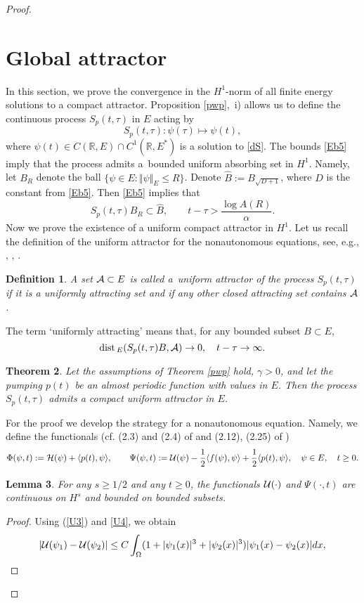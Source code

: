 \documentclass[11pt]{article}
\newtheorem{theorem}{Theorem}[section]
\newtheorem{definition}[theorem]{Definition}
\newtheorem{lemma}[theorem]{Lemma}
\newcommand{\fr}{\frac}
\newcommand{\R}{{\mathbb R}}
\newcommand{\cA}{{\cal A}}
\newcommand{\cH}{{\cal H}}
\newcommand{\cU}{{\cal U}}
\newcommand{\ga}{\gamma}
\newcommand{\Om}{\Omega}
\newcommand{\dist}{{\rm dist\5}}
\newcommand{\5}{{\hspace{0.5mm}}}
\numberwithin{equation}{section}
\newcommand{\ci}{\cite}
\newcommand{\la}{\label}
\newcommand{\be}{\begin{equation}}
\newcommand{\ee}{\end{equation}}
\newcommand{\bd}{\begin{definition}}
\newcommand{\ed}{\end{definition}}
\newcommand{\bt}{\begin{theorem}}
\newcommand{\et}{\end{theorem}}
\newcommand{\bl}{\begin{lemma}}
\newcommand{\el}{\end{lemma}}
\numberwithin{equation}{section}
\begin{document}
\begin{proof}
\section{Global attractor}\la{s4}
In this section, we prove the convergence
in the $H^1$-norm
of all finite energy solutions to a compact attractor.
Proposition \ref{pwp},~i) allows us to define the continuous process $S_p(t,\tau)$ in $E$ acting by
\be\la{Wtt}
S_p(t,\tau):\psi(\tau)\mapsto \psi(t),
\ee
where $\psi(t)\in C(\R,E)\cap C^1(\R, E^*)$ is a solution to \eqref{dS}.
The bounds \eqref{Eb5} imply that the process admits a~bounded uniform absorbing set in $H^1$.
Namely, let $B_R$ denote the ball $\{\psi\in E:\Vert\psi\Vert_E\le R\}$.
Denote $\hat B:=B_{\sqrt{D+1}}$, where $D$ is the constant from \eqref{Eb5}.
Then \eqref{Eb5} implies that
$$
S_p(t,\tau)B_R\subset \hat B,\qquad t-\tau> \fr{\log A(R)}\alpha.
$$
Now we prove the existence of a uniform compact attractor in $H^1$.
Let us recall the definition of the uniform attractor for the nonautonomous
equations, see, e.g., \ci{Har1991}, \cite[Definition A2.3]{CV1992}, \cite[Definition (7)]{CV1993}.
\bd\la{dA} \rm 
A set $\cA\subset E$ is called a~\textit{uniform attractor} of the process $S_p(t,\tau)$
if it is a uniformly attracting set and if any other closed attracting set contains $\cA$.
\ed
The term `uniformly attracting' means that, for any bounded subset $B\subset E$,
\be\la{attr}
\dist_E (S_p(t,\tau)B,\cA)\to 0,\quad t-\tau\to\infty.
\ee
\bt \la{tA}
Let the assumptions of Theorem {\rm \ref{pwp}} hold,
$\ga>0$, and let the pumping $p(t)$ be an almost periodic function with values in $E$.
Then the process $S_p(t,\tau)$ admits a compact uniform attractor in $E$.
\et
For the proof we develop the strategy \ci{B2004} for a nonautonomous equation.
Namely, we define the functionals (cf. (2.3) and (2.4) of \ci{L1995} and (2.12), (2.25) of \ci{W1995})
 \be\la{func}
 \Phi(\psi,t):=\cH(\psi)+\langle p( t),\psi \rangle,\qquad
 \Psi(\psi,t):=\cU(\psi)-\fr12\langle f(\psi),\psi \rangle+\fr12\langle p( t),\psi \rangle,\quad \psi\in E,\quad t\ge 0.
 \ee
 \bl \la{lwp}
 For any $s\ge 1/2$ and any $t\ge 0$, the functionals $\cU(\cdot)$ and $\Psi(\cdot,t)$ are continuous on $H^s$ and bounded on bounded subsets.
 \el
 \begin{proof}
 Using (\ref{U3}) and \eqref{U4}, we obtain
 $$
 |\cU(\psi_1)-\cU(\psi_2)|\le C\int_\Om (1+|\psi_1(x)|^3+|\psi_2(x)|^3)|\psi_1(x)-\psi_2(x)|dx,
$$
\end{proof}
\end{proof}
\end{document}
